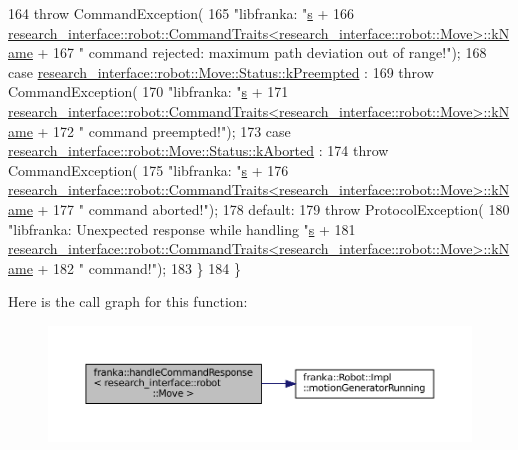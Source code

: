 \begin{DoxyCode}
164       \textcolor{keywordflow}{throw} CommandException(
165           \textcolor{stringliteral}{"libfranka: "}\hyperlink{namespaceservice__node__3_aa976421a49e0b54f23833423400849ae}{s} +
166           
      \hyperlink{structresearch__interface_1_1robot_1_1CommandTraits}{research\_interface::robot::CommandTraits<research\_interface::robot::Move>::kName}
       +
167           \textcolor{stringliteral}{" command rejected: maximum path deviation out of range!"});
168     \textcolor{keywordflow}{case} \hyperlink{structresearch__interface_1_1robot_1_1Move_a74e15d249324a1b2d28f0a7cf50dc794a1c4020a6c40116715412722a9f97333a}{research\_interface::robot::Move::Status::kPreempted}
      :
169       \textcolor{keywordflow}{throw} CommandException(
170           \textcolor{stringliteral}{"libfranka: "}\hyperlink{namespaceservice__node__3_aa976421a49e0b54f23833423400849ae}{s} +
171           
      \hyperlink{structresearch__interface_1_1robot_1_1CommandTraits}{research\_interface::robot::CommandTraits<research\_interface::robot::Move>::kName}
       +
172           \textcolor{stringliteral}{" command preempted!"});
173     \textcolor{keywordflow}{case} \hyperlink{structresearch__interface_1_1robot_1_1Move_a74e15d249324a1b2d28f0a7cf50dc794ac20d0424ae4484fda4424713f021d736}{research\_interface::robot::Move::Status::kAborted}
      :
174       \textcolor{keywordflow}{throw} CommandException(
175           \textcolor{stringliteral}{"libfranka: "}\hyperlink{namespaceservice__node__3_aa976421a49e0b54f23833423400849ae}{s} +
176           
      \hyperlink{structresearch__interface_1_1robot_1_1CommandTraits}{research\_interface::robot::CommandTraits<research\_interface::robot::Move>::kName}
       +
177           \textcolor{stringliteral}{" command aborted!"});
178     \textcolor{keywordflow}{default}:
179       \textcolor{keywordflow}{throw} ProtocolException(
180           \textcolor{stringliteral}{"libfranka: Unexpected response while handling "}\hyperlink{namespaceservice__node__3_aa976421a49e0b54f23833423400849ae}{s} +
181           
      \hyperlink{structresearch__interface_1_1robot_1_1CommandTraits}{research\_interface::robot::CommandTraits<research\_interface::robot::Move>::kName}
       +
182           \textcolor{stringliteral}{" command!"});
183   \}
184 \}
\end{DoxyCode}
Here is the call graph for this function\+:
\nopagebreak
\begin{figure}[H]
\begin{center}
\leavevmode
\includegraphics[width=350pt]{namespacefranka_a5a8aedd505670843172f84593054c094_cgraph}
\end{center}
\end{figure}
